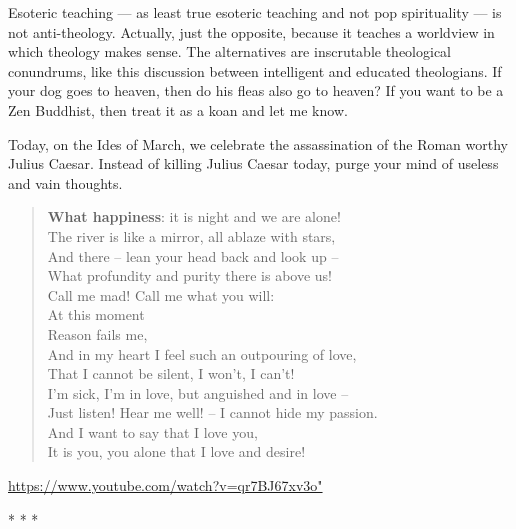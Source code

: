 Esoteric teaching — as least true esoteric teaching and not pop spirituality — is not anti-theology. Actually, just the opposite, because it teaches a worldview in which theology makes sense. The alternatives are inscrutable theological conundrums, like this discussion between intelligent and educated theologians. If your dog goes to heaven, then do his fleas also go to heaven? If you want to be a Zen Buddhist, then treat it as a koan and let me know.
 

Today, on the Ides of March, we celebrate the assassination of the Roman worthy Julius Caesar. Instead of killing Julius Caesar today, purge your mind of useless and vain thoughts.


\hfill

\begin{verse}
\textbf{What happiness}: it is night and we are alone!\\
The river is like a mirror, all ablaze with stars,\\
And there – lean your head back and look up –\\
What profundity and purity there is above us!\\
Call me mad! Call me what you will:\\
At this moment\\
Reason fails me,\\
And in my heart I feel such an outpouring of love,\\
That I cannot be silent, I won't, I can't!\\
I'm sick, I'm in love, but anguished and in love –\\
Just listen! Hear me well! – I cannot hide my passion.\\
And I want to say that I love you,\\
It is you, you alone that I love and desire!
\end{verse}

\url{https://www.youtube.com/watch?v=qr7BJ67xv3o"}




\begin{center}* * *\end{center}

